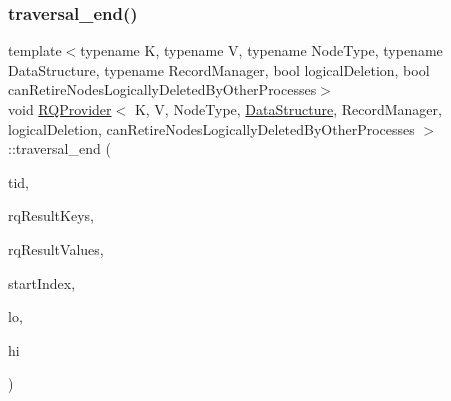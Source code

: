 \mbox{\label{classRQProvider_ad4bbd6a7d5ea8f497a49ba3bbd03f7fc}} 
\subsubsection{\texorpdfstring{traversal\+\_\+end()}{traversal\_end()}\hspace{0.1cm}{\footnotesize\ttfamily [3/5]}}
{\footnotesize\ttfamily template$<$typename K, typename V, typename Node\+Type, typename Data\+Structure, typename Record\+Manager, bool logical\+Deletion, bool can\+Retire\+Nodes\+Logically\+Deleted\+By\+Other\+Processes$>$ \\
void \hyperlink{classRQProvider}{R\+Q\+Provider}$<$ K, V, Node\+Type, \hyperlink{classDataStructure}{Data\+Structure}, Record\+Manager, logical\+Deletion, can\+Retire\+Nodes\+Logically\+Deleted\+By\+Other\+Processes $>$\+::traversal\+\_\+end (\begin{DoxyParamCaption}\item[{const int}]{tid,  }\item[{K $\ast$const}]{rq\+Result\+Keys,  }\item[{V $\ast$const}]{rq\+Result\+Values,  }\item[{int $\ast$const}]{start\+Index,  }\item[{const K \&}]{lo,  }\item[{const K \&}]{hi }\end{DoxyParamCaption})\hspace{0.3cm}{\ttfamily [inline]}}

\mbox{\label{classRQProvider_ad4bbd6a7d5ea8f497a49ba3bbd03f7fc}} 
